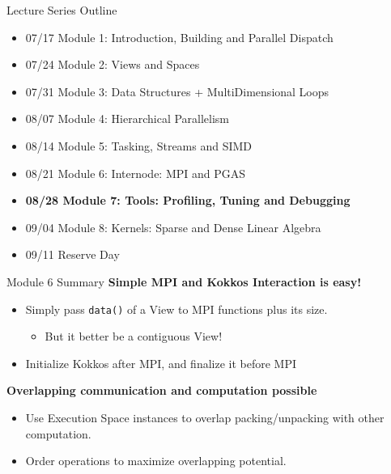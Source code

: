 \begin{frame}[fragile]{Lecture Series Outline}

\begin{itemize}
        \item 07/17 Module 1: Introduction, Building and Parallel Dispatch
        \item 07/24 Module 2: Views and Spaces
        \item 07/31 Module 3: Data Structures + MultiDimensional Loops
        \item 08/07 Module 4: Hierarchical Parallelism
        \item 08/14 Module 5: Tasking, Streams and SIMD
        \item 08/21 Module 6: Internode: MPI and PGAS
        \item \textbf{08/28 Module 7: Tools: Profiling, Tuning and Debugging}
        \item 09/04 Module 8: Kernels: Sparse and Dense Linear Algebra
        \item 09/11 Reserve Day
\end{itemize}

\end{frame}

\begin{frame}{Module 6 Summary}
\textbf{Simple MPI and Kokkos Interaction is easy!}
\begin{itemize}
  \item Simply pass \texttt{data()} of a View to MPI functions plus its size.
  \begin{itemize}
    \item But it better be a contiguous View!
  \end{itemize}
  \item Initialize Kokkos after MPI, and finalize it before MPI
\end{itemize}

\vspace{10pt}
\textbf{Overlapping communication and computation possible}
\begin{itemize}
  \item Use Execution Space instances to overlap packing/unpacking with other computation.
  \item Order operations to maximize overlapping potential. 
\end{itemize}
\end{frame}

